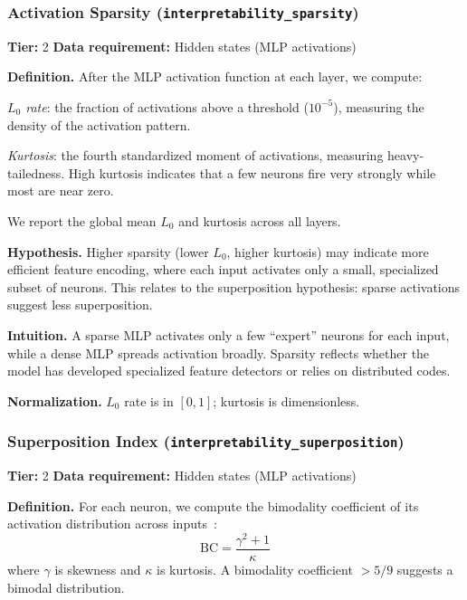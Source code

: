 \documentclass[preprint]{neurips_2025}
\begin{document}
\subsubsection{Activation Sparsity (\texttt{interpretability\_sparsity})}
\label{app:sparsity}

\textbf{Tier:} 2 \quad \textbf{Data requirement:} Hidden states (MLP activations)

\textbf{Definition.}
After the MLP activation function at each layer, we compute:

\emph{$L_0$ rate}: the fraction of activations above a threshold ($10^{-5}$), measuring the density of the activation pattern.

\emph{Kurtosis}: the fourth standardized moment of activations, measuring heavy-tailedness. High kurtosis indicates that a few neurons fire very strongly while most are near zero.

We report the global mean $L_0$ and kurtosis across all layers.

\textbf{Hypothesis.}
Higher sparsity (lower $L_0$, higher kurtosis) may indicate more efficient feature encoding, where each input activates only a small, specialized subset of neurons. This relates to the superposition hypothesis: sparse activations suggest less superposition.

\textbf{Intuition.}
A sparse MLP activates only a few ``expert'' neurons for each input, while a dense MLP spreads activation broadly. Sparsity reflects whether the model has developed specialized feature detectors or relies on distributed codes.

\textbf{Normalization.} $L_0$ rate is in $[0, 1]$; kurtosis is dimensionless.

\subsubsection{Superposition Index (\texttt{interpretability\_superposition})}
\label{app:superposition}

\textbf{Tier:} 2 \quad \textbf{Data requirement:} Hidden states (MLP activations)

\textbf{Definition.}
For each neuron, we compute the bimodality coefficient of its activation distribution across inputs~\citep{templeton2024scaling}:
\begin{equation}
  \text{BC} = \frac{\gamma^2 + 1}{\kappa}
\end{equation}
where $\gamma$ is skewness and $\kappa$ is kurtosis. A bimodality coefficient $> 5/9$ suggests a bimodal distribution.
\end{document}
